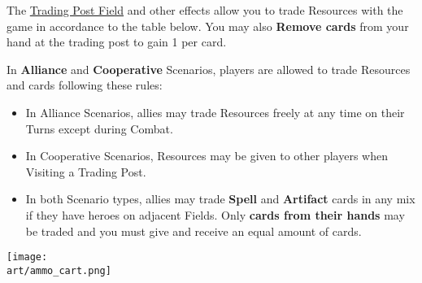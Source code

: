 \begin{multicols}{2}

The \hyperlink{Trading Post}{Trading Post Field} and other effects allow you to \hypertarget{Trading}{trade} Resources with the game in accordance to the table below.
You may also \textbf{Remove cards} from your hand at the trading post to gain 1  per card.\par
{}\par
In \textbf{Alliance} and \textbf{Cooperative} Scenarios, players are allowed to trade Resources and cards following these rules:
\begin{itemize}
  \item In Alliance Scenarios, allies may trade Resources freely at any time on their Turns except during Combat.
  \item In Cooperative Scenarios, Resources may be given to other players when Visiting a Trading Post.
  \columnbreak
  \item In both Scenario types, allies may trade \textbf{Spell} and \textbf{Artifact} cards in any mix if they have heroes on adjacent Fields.
    Only \textbf{cards from their hands} may be traded and you must give and receive an equal amount of cards.
\end{itemize}

\vspace*{\fill}
\texttt{[image: \\art/ammo\_cart.png]}

\end{multicols}

\newcommand{\darkcell}[1]{
	\begin{tikzpicture}
		\filldraw[thick, fill=black, fill opacity=0.5, draw=darkcellborder] (0, 0) rectangle (\linewidth, 1);
		\node at (current bounding box.center) {#1};
	\end{tikzpicture}
}

\newcommand{\lightcell}[1]{
	\begin{tikzpicture}
		\filldraw[thick, fill=black, fill opacity=0.2, draw=lightcellborder] (0, 0) rectangle (\linewidth, 1);
		\node at (current bounding box.center) {\color{white}#1};
	\end{tikzpicture}
}

